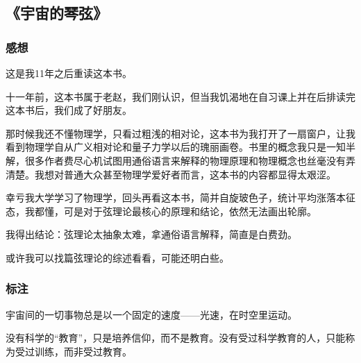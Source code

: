 \subsection{《宇宙的琴弦》}
\subsubsection{感想}

这是我11年之后重读这本书。

十一年前，这本书属于老赵，我们刚认识，但当我饥渴地在自习课上并在后排读完这本书后，我们成了好朋友。

那时候我还不懂物理学，只看过粗浅的相对论，这本书为我打开了一扇窗户，让我看到物理学自从广义相对论和量子力学以后的瑰丽画卷。书里的概念我只是一知半解，很多作者费尽心机试图用通俗语言来解释的物理原理和物理概念也丝毫没有弄清楚。我想对普通大众甚至物理学爱好者而言，这本书的内容都显得太艰涩。

幸亏我大学学习了物理学，回头再看这本书，简并自旋玻色子，统计平均涨落本征态，我都懂，可是对于弦理论最核心的原理和结论，依然无法画出轮廓。

我得出结论：弦理论太抽象太难，拿通俗语言解释，简直是白费劲。

或许我可以找篇弦理论的综述看看，可能还明白些。

\subsubsection{标注}

宇宙间的一切事物总是以一个固定的速度——光速，在时空里运动。

没有科学的“教育”，只是培养信仰，而不是教育。没有受过科学教育的人，只能称为受过训练，而非受过教育。